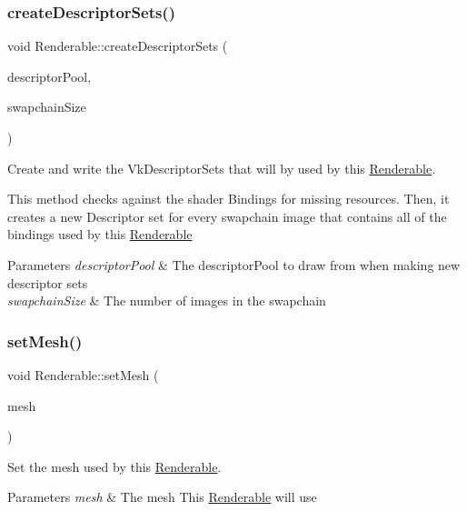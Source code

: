 \subsubsection{\texorpdfstring{createDescriptorSets()}{createDescriptorSets()}}
{\footnotesize\ttfamily void Renderable\+::create\+Descriptor\+Sets (\begin{DoxyParamCaption}\item[{const Vk\+Descriptor\+Pool \&}]{descriptor\+Pool,  }\item[{uint32\+\_\+t}]{swapchain\+Size }\end{DoxyParamCaption})}



Create and write the Vk\+Descriptor\+Sets that will by used by this \mbox{\hyperlink{class_renderable}{Renderable}}. 

This method checks against the shader Bindings for missing resources. Then, it creates a new Descriptor set for every swapchain image that contains all of the bindings used by this \mbox{\hyperlink{class_renderable}{Renderable}}


\begin{DoxyParams}{Parameters}
{\em descriptor\+Pool} & The descriptor\+Pool to draw from when making new descriptor sets \\
\hline
{\em swapchain\+Size} & The number of images in the swapchain \\
\hline
\end{DoxyParams}
\mbox{\label{class_renderable_a22514bc720361a64a3aa90239725f87d}} 
\subsubsection{\texorpdfstring{setMesh()}{setMesh()}}
{\footnotesize\ttfamily void Renderable\+::set\+Mesh (\begin{DoxyParamCaption}\item[{std\+::shared\+\_\+ptr$<$ \mbox{\hyperlink{class_mesh}{Mesh}} $>$}]{mesh }\end{DoxyParamCaption})}



Set the mesh used by this \mbox{\hyperlink{class_renderable}{Renderable}}. 


\begin{DoxyParams}{Parameters}
{\em mesh} & The mesh This \mbox{\hyperlink{class_renderable}{Renderable}} will use \\
\hline
\end{DoxyParams}
\mbox{\label{class_renderable_a60e28e983a2bd612ea97af28c461e03f}} 
